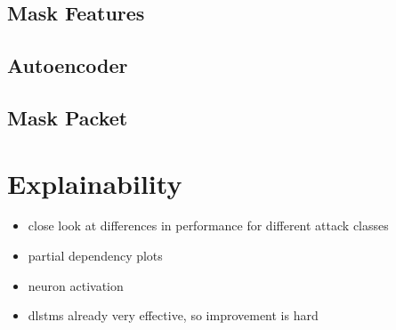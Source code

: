 \subsection{Mask Features} \label{sec:results:transformer:mask_features}

\subsection{Autoencoder} \label{sec:results:transformer:autoencoder}

\subsection{Mask Packet} \label{sec:results:transformer:mask_packet}

\section{Explainability}

\begin{itemize}
	\item close look at differences in performance for different attack classes
	\item partial dependency plots
	\item neuron activation
	\item \gls{dlstm}s already very effective, so improvement is hard
\end{itemize}

\newpage
